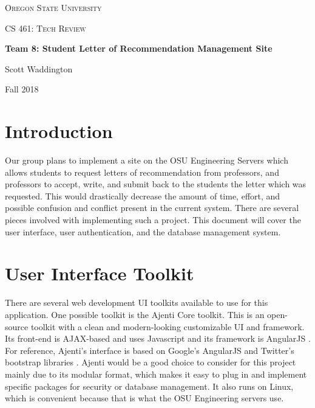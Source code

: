 \documentclass[letterpaper, 10pt, draftclsnofoot,onecolumn]{IEEEtran}
\begin{document}
\begin{titlepage}
     \centering
     {\scshape\LARGE Oregon State University \par}
     \vspace{1cm}
     {\scshape\Large CS 461: Tech Review\par}
     \vspace{1.5cm}
     {\huge\bfseries Team 8: Student Letter of Recommendation Management Site\par}
     \vspace{2cm}
     {\Large Scott Waddington\par}
     \vfill

    \begin{abstract}
        This document serves to illustrate a portion of the specific technologies that we plan to use in order to implement our project.
    \end{abstract}

    \vfill

    {\large Fall 2018\par}
\end{titlepage}

\clearpage
\newpage

\section{Introduction}
Our group plans to implement a site on the OSU Engineering Servers which allows students to request letters of recommendation from professors, and professors to accept, write, and submit back to the students the letter which was requested. This would drastically decrease the amount of time, effort, and possible confusion and conflict present in the current system. There are several pieces involved with implementing such a project. This document will cover the user interface, user authentication, and the database management system.

\section{User Interface Toolkit}
There are several web development UI toolkits available to use for this application. One possible toolkit is the Ajenti Core toolkit. This is an open-source toolkit with a clean and modern-looking customizable UI and framework. Its front-end is AJAX-based and uses Javascript and its framework is AngularJS \cite{ajenti}. For reference, Ajenti's interface is based on Google's AngularJS and Twitter's bootstrap libraries \cite{ajenti}. Ajenti would be a good choice to consider for this project mainly due to its modular format, which makes it easy to plug in and implement specific packages for security or database management. It also runs on Linux, which is convenient because that is what the OSU Engineering servers use.
\end{document}
